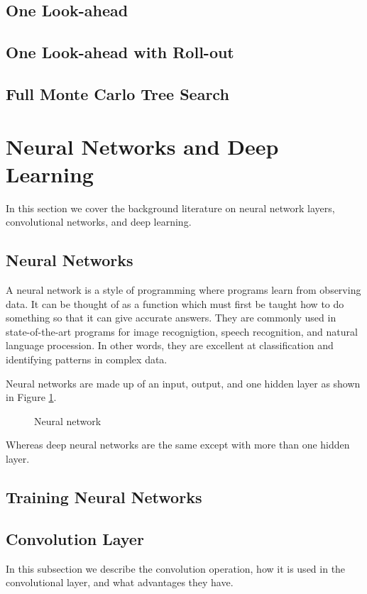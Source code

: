 \documentclass{bhamthesis}
\theoremstyle{definition}
\begin{document}
\subsection{One Look-ahead}
\subsection{One Look-ahead with Roll-out}
\subsection{Full Monte Carlo Tree Search}
\section{Neural Networks and Deep Learning}
In this section we cover the background literature on neural network layers, convolutional networks, and deep learning.

\subsection{Neural Networks}
A neural network is a style of programming where programs learn from observing data. It can be thought of as a function which must first be taught how to do something so that it can give accurate answers. They are commonly used in state-of-the-art programs for image recognigtion, speech recognition, and natural language procession. In other words, they are excellent at classification and identifying patterns in complex data.

Neural networks are made up of an input, output, and one hidden layer as shown in Figure \ref{f:NN}.
\begin{figure}
	
	\caption{Neural network}\label{f:NN}
\end{figure}
Whereas deep neural networks are the same except with more than one hidden layer.

\subsection{Training Neural Networks}

\subsection{Convolution Layer}
In this subsection we describe the convolution operation, how it is used in the convolutional layer, and what advantages they have.
\end{document}
